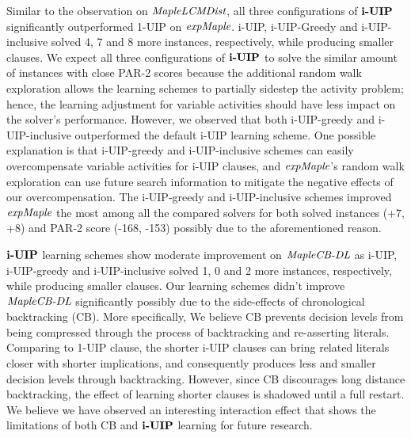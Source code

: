 Similar to the observation on $\textit{MapleLCMDist}$, all three configurations of $\textbf{i-UIP}$ significantly outperformed 1-UIP on $\textit{expMaple}$. i-UIP, i-UIP-Greedy and i-UIP-inclusive solved 4, 7 and 8 more instances, respectively, while producing smaller clauses. We expect all three configurations of $\textbf{i-UIP}$ to solve the similar amount of instances with close PAR-2 scores because the additional random walk exploration allows the learning schemes to partially sidestep the activity problem; hence, the learning adjustment for variable activities should have less impact on the solver's performance. However, we observed that both i-UIP-greedy and i-UIP-inclusive outperformed the default i-UIP learning scheme. One possible explanation is that i-UIP-greedy and i-UIP-inclusive schemes can easily overcompensate variable activities for i-UIP clauses, and $\textit{expMaple}$'s random walk exploration can use future search information to mitigate the negative effects of our overcompensation. The i-UIP-greedy and i-UIP-inclusive schemes improved $\textit{expMaple}$ the most among all the compared solvers for both solved instances (+7, +8) and PAR-2 score (-168, -153) possibly due to the aforementioned reason.

$\textbf{i-UIP}$ learning schemes show moderate improvement on $\textit{MapleCB-DL}$ as i-UIP, i-UIP-greedy and i-UIP-inclusive solved 1, 0 and 2 more instances, respectively, while producing smaller clauses. Our learning schemes didn't improve $\textit{MapleCB-DL}$ significantly possibly due to the side-effects of chronological backtracking (CB). More specifically, We believe CB prevents decision levels from being compressed through the process of backtracking and re-asserting literals. Comparing to 1-UIP clause, the shorter i-UIP clauses can bring related literals closer with shorter implications, and consequently produces less and smaller decision levels through  backtracking. However, since CB discourages long distance backtracking, the effect of learning shorter clauses is shadowed until a full restart.  We believe we have observed an interesting interaction effect that shows the limitations of both CB and $\textbf{i-UIP}$ learning for future research.
